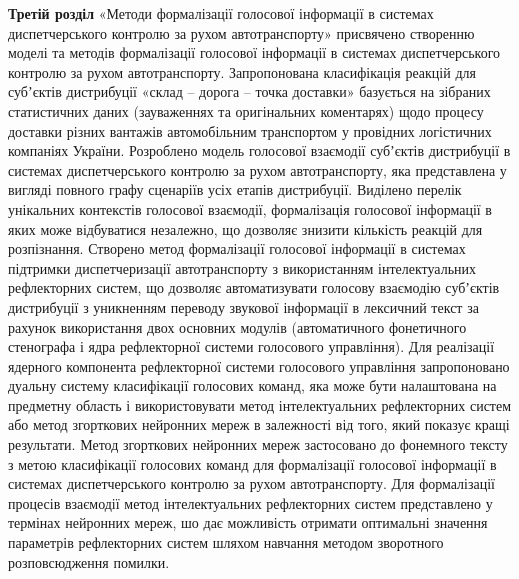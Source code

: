 \textbf{Третій розділ} «Методи формалізації голосової інформації в системах диспетчерського контролю за рухом автотранспорту» присвячено створенню моделі та методів формалізації голосової інформації в системах диспетчерського контролю за рухом автотранспорту.
Запропонована класифікація реакцій для субʼєктів дистрибуції «склад – дорога – точка доставки» базується на зібраних статистичних даних (зауваженнях та оригінальних коментарях) щодо процесу доставки різних вантажів автомобільним транспортом у провідних логістичних компаніях України.
Розроблено модель голосової взаємодії субʼєктів дистрибуції в системах диспетчерського контролю за рухом автотранспорту, яка представлена у вигляді повного графу сценаріїв усіх етапів дистрибуції. 
Виділено перелік унікальних контекстів голосової взаємодії, формалізація голосової інформації в яких може відбуватися незалежно, що дозволяє знизити кількість реакцій для розпізнання.
Створено метод формалізації голосової інформації в системах підтримки диспетчеризації автотранспорту з використанням інтелектуальних рефлекторних систем, що дозволяє автоматизувати голосову взаємодію субʼєктів дистрибуції з уникненням переводу звукової інформації в лексичний текст за рахунок використання двох основних модулів (автоматичного фонетичного стенографа і ядра рефлекторної системи голосового управління).
Для реалізації ядерного компонента рефлекторної системи голосового управління запропоновано дуальну систему класифікації голосових команд, яка може бути налаштована на предметну область і використовувати метод інтелектуальних рефлекторних систем або метод згорткових нейронних мереж в залежності від того, який показує кращі результати.
Метод згорткових нейронних мереж застосовано до фонемного тексту з метою класифікації голосових команд для формалізації голосової інформації в системах диспетчерського контролю за рухом автотранспорту.
Для формалізації процесів взаємодії метод інтелектуальних рефлекторних систем представлено у термінах нейронних мереж, шо дає можливість отримати оптимальні значення параметрів рефлекторних систем шляхом навчання методом зворотного розповсюдження помилки.


